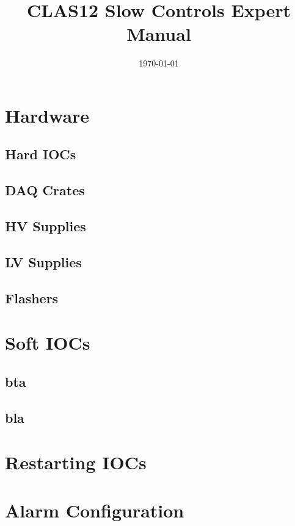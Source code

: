 \documentclass[amsmath,amssymb,notitlepage,11pt]{revtex4}
\begin{document}
\title{CLAS12 Slow Controls Expert Manual}
\date{\today}
\begin{abstract}
\end{abstract}

\maketitle
\tableofcontents
\newpage

\section{Hardware}
\subsection{Hard IOCs}
\subsection{DAQ Crates}
\subsection{HV Supplies}
\subsection{LV Supplies}
\subsection{Flashers}

\section{Soft IOCs}
\subsection{bta}
\subsection{bla}

\section{Restarting IOCs}

\section{Alarm Configuration}
\end{document}
